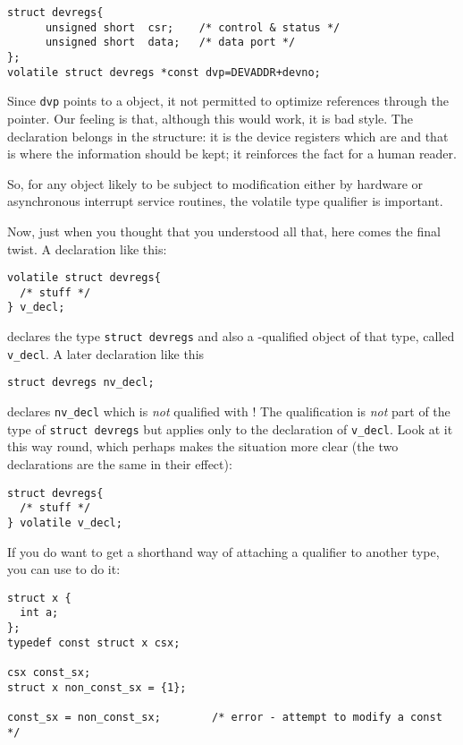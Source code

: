 \begin{Verbatim}
struct devregs{
      unsigned short  csr;    /* control & status */
      unsigned short  data;   /* data port */
};
volatile struct devregs *const dvp=DEVADDR+devno;
\end{Verbatim}

   Since \texttt{dvp} points to a \volatile{} object, it
    not permitted to optimize references through the pointer. Our feeling is
    that, although this would work, it is bad style. The
    \volatile{} declaration belongs in the structure: it is the
    device registers which are \volatile{} and that is where the
    information should be kept; it reinforces the fact for a human
    reader.


   So, for any object likely to be subject to modification either by
    hardware or asynchronous interrupt service routines, the volatile type
    qualifier is important.


   Now, just when you thought that you understood all that, here comes
    the final twist. A declaration like this:


\begin{Verbatim}
volatile struct devregs{
  /* stuff */
} v_decl;
\end{Verbatim}

   declares the type \texttt{struct devregs} and also
    a \volatile-qualified object of that type, called
    \texttt{v\_decl}. A later declaration like this


\begin{Verbatim}
struct devregs nv_decl;
\end{Verbatim}

   declares \texttt{nv\_decl} which is \textit{not} qualified with
    \volatile{}! The qualification is \textit{not} part of the
    type of \texttt{struct devregs} but applies only to the declaration
    of \texttt{v\_decl}. Look at it this way round, which perhaps makes
    the situation more clear (the two declarations are the same in their
    effect):


\begin{Verbatim}
struct devregs{
  /* stuff */
} volatile v_decl;
\end{Verbatim}

    If you do want to get a shorthand way of attaching a qualifier to
    another type, you can use \typedef{} to do it:


\begin{Verbatim}
struct x {
  int a;
};
typedef const struct x csx;

csx const_sx;
struct x non_const_sx = {1};

const_sx = non_const_sx;        /* error - attempt to modify a const */
\end{Verbatim}

